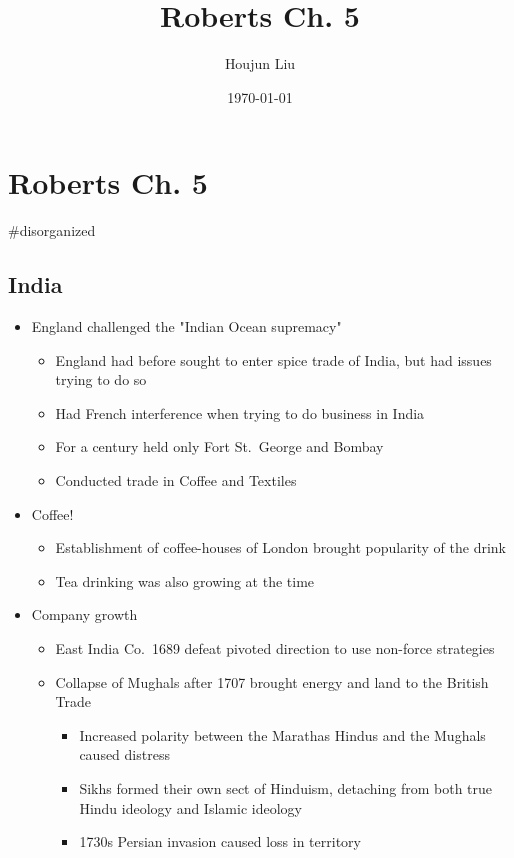 \documentclass[letterpaper]{article}
\author{Houjun Liu}
\date{\today}
\title{Roberts Ch. 5}
\renewcommand{\tableofcontents}{}
\begin{document}
\tableofcontents



\section{Roberts Ch. 5}
\label{sec:orge2c2db0}
\#disorganized

\subsection{India}
\label{sec:org0316c4e}
\begin{itemize}
\item England challenged the "Indian Ocean supremacy"

\begin{itemize}
\item England had before sought to enter spice trade of India, but had
issues trying to do so
\item Had French interference when trying to do business in India
\item For a century held only Fort St. George and Bombay
\item Conducted trade in Coffee and Textiles
\end{itemize}

\item Coffee!

\begin{itemize}
\item Establishment of coffee-houses of London brought popularity of the
drink
\item Tea drinking was also growing at the time
\end{itemize}

\item Company growth

\begin{itemize}
\item East India Co. 1689 defeat pivoted direction to use non-force
strategies
\item Collapse of Mughals after 1707 brought energy and land to the
British Trade

\begin{itemize}
\item Increased polarity between the Marathas Hindus and the Mughals
caused distress
\item Sikhs formed their own sect of Hinduism, detaching from both true
Hindu ideology and Islamic ideology
\item 1730s Persian invasion caused loss in territory
\end{itemize}


\end{itemize}
\end{itemize}
\end{document}
